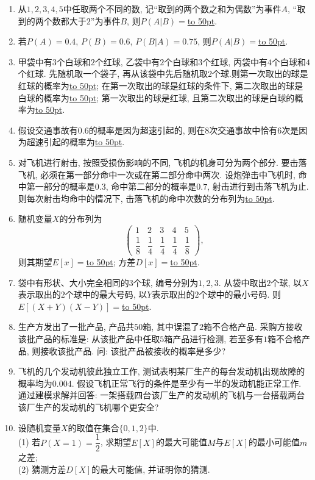 \documentclass[10pt,a4paper]{article}
\newcommand{\blank}[1]{\underline{\hbox to #1pt{}}}
\begin{document}

\begin{enumerate}[1.]

\item 从$1,2,3,4,5$中任取两个不同的数, 记``取到的两个数之和为偶数''为事件$A$, ``取到的两个数都大于$2$''为事件$B$, 则$P(A|B)=$\blank{50}.

\item 若$P(A)=0.4$, $P(B)=0.6$, $P(B|A)=0.75$, 则$P(A|B)=$\blank{50}.


\item 甲袋中有$3$个白球和$2$个红球, 乙袋中有$2$个白球和$3$个红球, 丙袋中有$4$个白球和$4$个红球. 先随机取一个袋子, 再从该袋中先后随机取$2$个球.则第一次取出的球是红球的概率为\blank{50}; 在第一次取出的球是红球的条件下, 第二次取出的球是白球的概率为\blank{50}; 第一次取出的球是红球, 且第二次取出的球是白球的概率为\blank{50}.



\item 假设交通事故有$0.6$的概率是因为超速引起的, 则在$8$次交通事故中恰有$6$次是因为超速引起的概率为\blank{50}.


\item 对飞机进行射击, 按照受损伤影响的不同, 飞机的机身可分为两个部分. 要击落飞机, 必须在第一部分命中一次或在第二部分命中两次. 设炮弹击中飞机时, 命中第一部分的概率是$0.3$, 命中第二部分的概率是$0.7$, 射击进行到击落飞机为止. 则每次射击均命中的情况下, 击落飞机的命中次数的分布列为\blank{50}. 



\item 随机变量$X$的分布列为
\[\begin{pmatrix} 1 & 2 & 3 & 4 & 5 \\ \dfrac 18 & \dfrac 14 & \dfrac 14 & \dfrac 14 & \dfrac 18\end{pmatrix},\]
则其期望$E[x]=$\blank{50}; 方差$D[x]=$\blank{50}.

\item 袋中有形状、大小完全相同的$3$个球, 编号分别为$1,2,3$. 从袋中取出$2$个球, 以$X$表示取出的$2$个球中的最大号码, 以$Y$表示取出的$2$个球中的最小号码. 则$E[(X+Y)(X-Y)]=$\blank{50}.

\item 生产方发出了一批产品, 产品共$50$箱, 其中误混了$2$箱不合格产品. 采购方接收该批产品的标准是: 从该批产品中任取$5$箱产品进行检测, 若至多有$1$箱不合格产品, 则接收该批产品. 问: 该批产品被接收的概率是多少? 


\item 飞机的几个发动机彼此独立工作, 测试表明某厂生产的每台发动机出现故障的概率均为$0.004$. 假设飞机正常飞行的条件是至少有一半的发动机能正常工作. 通过建模求解并回答: 一架搭载四台该厂生产的发动机的飞机与一台搭载两台该厂生产的发动机的飞机哪个更安全?


\item 设随机变量$X$的取值在集合$\{0,1,2\}$中.\\
(1) 若$P(X=1)=\dfrac 12$, 求期望$E[X]$的最大可能值$M$与$E[X]$的最小可能值$m$之差;\\
(2) 猜测方差$D[X]$的最大可能值, 并证明你的猜测.

\end{enumerate}
\end{document}
